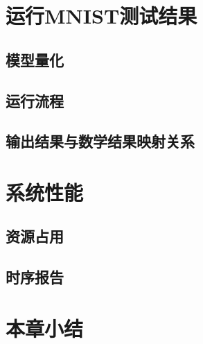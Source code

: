 \section{运行MNIST测试结果}
    \subsection{模型量化}
    \subsection{运行流程}
    \subsection{输出结果与数学结果映射关系}

\section{系统性能}
    \subsection{资源占用}
    \subsection{时序报告}

\section{本章小结}





